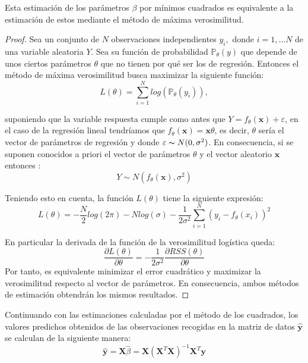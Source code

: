\begin{propo}
Esta estimación de los parámetros $\beta$ por mínimos cuadrados es equivalente a la estimación de estos mediante el método de máxima verosimilitud.
\begin{proof}
Sea un conjunto de $N$ observaciones independientes $y_i, $ donde $i=1,\ldots N$ de una variable aleatoria $Y$. Sea su  función de probabilidad  $\mathbb{P}_\theta(y)$ que depende de unos ciertos parámetros $\theta$ que no tienen por qué ser los de regresión. Entonces el método de máxima verosimilitud busca maximizar la siguiente función:
\begin{equation}
L(\theta)=\sum_{i=1}^N log( \mathbb{P}_{\theta} (y_i)),
\end{equation}

\noindent suponiendo que la variable respuesta cumple como antes que  $Y=f_\theta (\textbf{x})+\varepsilon$, en el caso de la regresión lineal tendríamos que $f_\theta(\mathbf{x})=\mathbf{x}\theta$, es decir, $\theta$ sería el vector de parámetros de regresión y donde $\varepsilon \thicksim N(0,\sigma^2)$. En consecuencia, si se suponen conocidos a priori el vector de parámetros $\theta$ y el vector aleatorio $\textbf{x}$ entonces :
\begin{equation}
Y\sim N(f_\theta(\textbf{x}), \sigma^2)
\end{equation}

\noindent Teniendo esto en cuenta, la función $L(\theta)$ tiene la siguiente expresión:
\begin{equation}
L(\theta)=-\dfrac{N}{2}log(2\pi)-N log(\sigma)-\dfrac{1}{2\sigma^2}\sum_{i=1}^N (y_i-f_\theta(x_i))^2
\end{equation}

\noindent En particular la derivada de la función de la verosimilitud logística queda:
\begin{equation}
\dfrac{\partial L(\theta)}{\partial \theta}=-\dfrac{1}{2\sigma^2}\dfrac{\partial RSS(\theta)}{\partial \theta}
\end{equation}
\noindent Por tanto, es equivalente minimizar el error cuadrático y maximizar la verosimilitud respecto al vector de parámetros. En consecuencia, ambos métodos de estimación obtendrán los mismos resultados. 
\end{proof}
\end{propo}

\noindent Continuando con las estimaciones calculadas por el método de los cuadrados, los valores predichos obtenidos de las observaciones recogidas en la matriz de datos $\hat{\textbf{y}}$ se calculan de la siguiente manera:
\begin{equation}
\hat{\textbf{y}}=\textbf{X}\hat{\beta}=\textbf{X}(\textbf{X}^T\textbf{X})^{-1}\textbf{X}^T\textbf{y}
\end{equation}


